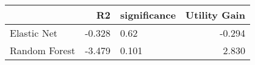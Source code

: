 \begin{tabular}{lrlr}
\toprule
{} &     R2 & significance &  Utility Gain \\
\midrule
Elastic Net   & -0.328 &        0.62  &        -0.294 \\
Random Forest & -3.479 &       0.101  &         2.830 \\
\bottomrule
\end{tabular}

